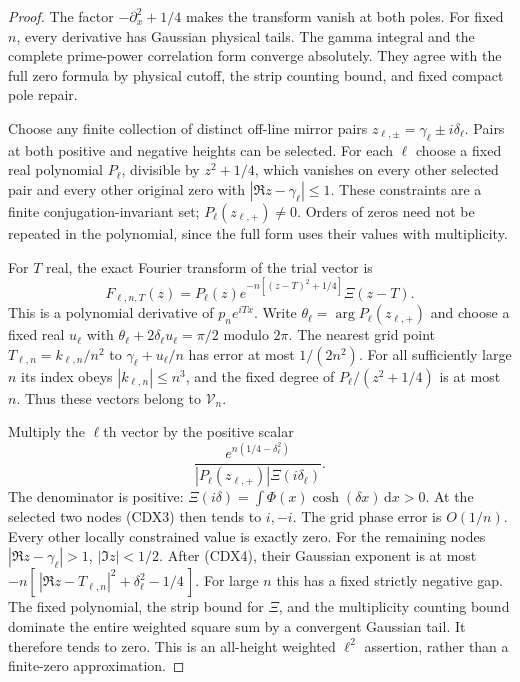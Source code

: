 \documentclass[11pt]{article}
\theoremstyle{remark}\newtheorem{remark}[theorem]{Remark}
\newcommand{\dd}{\,\mathrm d}
\begin{document}
\begin{proof}
The factor $-\partial_x^2+1/4$ makes the transform vanish
at both poles. For fixed $n$, every derivative has Gaussian
physical tails. The gamma integral and the complete
prime-power correlation form converge absolutely.
They agree with the full zero formula by physical cutoff,
the strip counting bound, and fixed compact pole repair.

Choose any finite collection of distinct off-line mirror
pairs $z_{\ell,\pm}=\gamma_\ell\pm i\delta_\ell$.
Pairs at both positive and negative heights can be selected.
For each $\ell$ choose a fixed real polynomial $P_\ell$,
divisible by $z^2+1/4$, which vanishes on every other selected
pair and every other original zero with
$|\Re z-\gamma_\ell|\le1$.
These constraints are a finite conjugation-invariant set;
$P_\ell(z_{\ell,+})\ne0$.
Orders of zeros need not be repeated in the polynomial,
since the full form uses their values with multiplicity.

For $T$ real, the exact Fourier transform of the trial vector is
\[
 F_{\ell,n,T}(z)=
 P_\ell(z)e^{-n[(z-T)^2+1/4]}\Xi(z-T).                    \tag{CDX3}
\]
This is a polynomial derivative of $p_n e^{iTx}$.
Write $\theta_\ell=\arg P_\ell(z_{\ell,+})$ and choose a
fixed real $u_\ell$ with
$\theta_\ell+2\delta_\ell u_\ell=\pi/2$ modulo $2\pi$.
The nearest grid point
$T_{\ell,n}=k_{\ell,n}/n^2$ to $\gamma_\ell+u_\ell/n$
has error at most $1/(2n^2)$.
For all sufficiently large $n$ its index obeys
$|k_{\ell,n}|\le n^3$, and the fixed degree of
$P_\ell/(z^2+1/4)$ is at most $n$.
Thus these vectors belong to $\mathcal V_n$.

Multiply the $\ell$th vector by the positive scalar
\[
 \frac{e^{n(1/4-\delta_\ell^2)}}
                {|P_\ell(z_{\ell,+})|\Xi(i\delta_\ell)}.
                                                        \tag{CDX4}
\]
The denominator is positive: $\Xi(i\delta)=
\int\Phi(x)\cosh(\delta x)\dd x>0$.
At the selected two nodes (CDX3) then tends to $i,-i$.
The grid phase error is $O(1/n)$.
Every other locally constrained value is exactly zero.
For the remaining nodes $|\Re z-\gamma_\ell|>1$,
$|\Im z|<1/2$.
After (CDX4), their Gaussian exponent is at most
$-n[\,|\Re z-T_{\ell,n}|^2+\delta_\ell^2-1/4\,]$.
For large $n$ this has a fixed strictly negative gap.
The fixed polynomial, the strip bound for $\Xi$,
and the multiplicity counting bound dominate the entire
weighted square sum by a convergent Gaussian tail.
It therefore tends to zero. This is an all-height
weighted $\ell^2$ assertion, rather than a finite-zero
approximation.


\end{proof}
\end{document}

